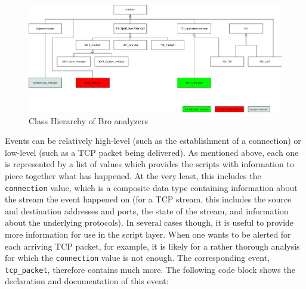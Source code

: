 \begin{figure}[!t]
\centering
\includegraphics[angle = 90, scale = 0.75]{Figures/als.png}
\caption{Class Hierarchy of Bro analyzers}
\label{pic:als}
\end{figure}


Events can be relatively high-level (such as the establishment of a connection) or low-level (such as a TCP packet being delivered). As mentioned above, each one is represented by a list of values which provides the scripts with information to piece together what has happened. At the very least, this includes the \texttt{connection} value, which is a composite data type containing information about the stream the event happened on (for a TCP stream, this includes the source and destination addresses and ports, the state of the stream, and information about the underlying protocols). In several cases though, it is useful to provide more information for use in the script layer. When one wants to be alerted for each arriving TCP packet, for example, it is likely for a rather thorough analysis for which the \texttt{connection} value is not enough. The corresponding event, \texttt{tcp\_packet}, therefore contains much more. The following code block shows the declaration and documentation of this event: \\ \\

